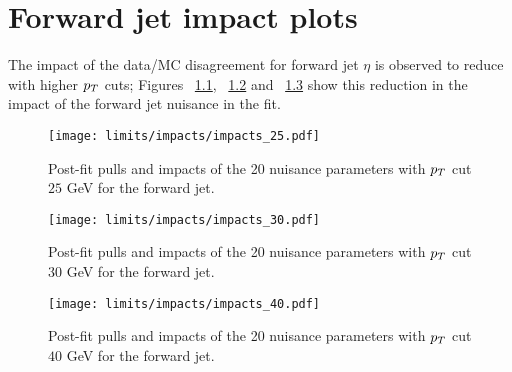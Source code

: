 \chapter{Forward jet impact plots}\label{app:forward_jet_impact}

The impact of the data/MC disagreement for forward jet $\eta$ is observed to reduce with higher $\pt$ cuts; Figures ~\ref{fig:impact25}, ~\ref{fig:impact30} and ~\ref{fig:impact40} show this reduction in the impact of the forward jet \etac nuisance in the fit.

\begin{figure} [!h]
 \centering
 \texttt{[image: limits/impacts/impacts\_25.pdf]}\\
\caption[Post-fit pulls and impacts with $\pt$ cut $25$ GeV for the forward jet]{Post-fit pulls and impacts of the 20 nuisance parameters with $\pt$ cut $25$ GeV for the forward jet.}
\label{fig:impact25}
\end{figure}

\begin{figure} [!h]
 \centering
 \texttt{[image: limits/impacts/impacts\_30.pdf]}\\
\caption[Post-fit pulls and impacts with $\pt$ cut $30$ GeV for the forward jet]{Post-fit pulls and impacts of the 20 nuisance parameters with $\pt$ cut $30$ GeV for the forward jet.}
\label{fig:impact30}
\end{figure}

\begin{figure} [!h]
 \centering
 \texttt{[image: limits/impacts/impacts\_40.pdf]}\\
\caption[Post-fit pulls and impacts with $\pt$ cut $25$ GeV for the forward jet]{Post-fit pulls and impacts of the 20 nuisance parameters with $\pt$ cut $40$ GeV for the forward jet.}
\label{fig:impact40}
\end{figure}
